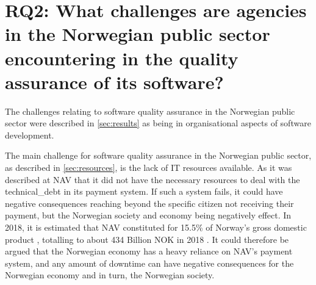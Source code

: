 \section{RQ2: What challenges are agencies in the Norwegian public sector encountering in the quality assurance of its software?}
The challenges relating to software quality assurance in the Norwegian public sector were described in \autoref{sec:results} as being in organisational aspects of software development.

The main challenge for software quality assurance in the Norwegian public sector, as described in \autoref{sec:resources}, is the lack of IT resources available. As it was described at NAV that it did not have the necessary resources to deal with the \gls{technical_debt} in its payment system. If such a system fails, it could have negative consequences reaching beyond the specific citizen not receiving their payment, but the Norwegian society and economy being negatively effect. In 2018, it is estimated that NAV constituted for 15.5\% of Norway's gross domestic product \cite{nav_ytelsene_frem_mot_2060_2019}, totalling to about 434 Billion NOK in 2018 \cite{faktaark_finansdepartementet_2020}. It could therefore be argued that the Norwegian economy has a heavy reliance on NAV's payment system, and any amount of downtime can have negative consequences for the Norwegian economy and in turn, the Norwegian society.



